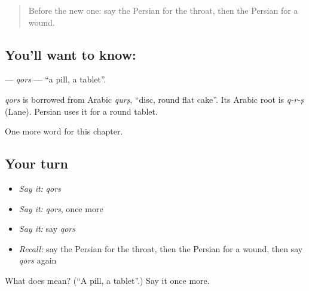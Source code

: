 \label{lesson:FA-C150-qors}



\begin{quote}
Before the new one: say the Persian for the throat, then the Persian for a wound.
\end{quote}

\subsection*{You'll want to know: }
\textbf{} — \emph{qors} — \textquotedblleft{}a pill, a tablet\textquotedblright{}.

\begin{cousinweb}
\emph{qors} is borrowed from Arabic \emph{qurṣ}, \textquotedblleft{}disc, round flat cake\textquotedblright{}. Its Arabic root is \emph{q-r-ṣ} (Lane). Persian uses it for a round tablet.
\end{cousinweb}

\begin{grammarlens}[title={What you've built}]
One more word for this chapter.
\end{grammarlens}

\subsection*{Your turn}
\begin{itemize}
\raggedright
  \item \emph{Say it:} \emph{qors}
  \item \emph{Say it:} \emph{qors}, once more
  \item \emph{Say it:} say \emph{qors}
  \item \emph{Recall:} say the Persian for the throat, then the Persian for a wound, then say \emph{qors} again
\end{itemize}

\begin{tcolorbox}[breakable,colback=teal!4,colframe=teal!35!black,title={Before you move on}]
What does  mean? (\textquotedblleft{}A pill, a tablet\textquotedblright{}.) Say it once more.
\end{tcolorbox}
